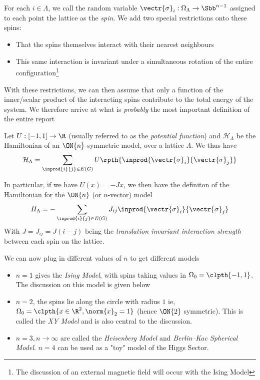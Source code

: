 	For each $i \in \Lambda$, we call the random variable $\vectr{\sigma}_i: \Omega_{\Lambda} 
	\rightarrow \Sbb^{n-1}$ assigned to each point the lattice as the \textit{spin}. We add two special
	restrictions onto these spins: 
	\begin{itemize}
		\item That the spins themselves interact with their nearest neighbours
		\item This same interaction is invariant under a simultaneous rotation of the 
			entire configuration\footnote{The discussion of an external magnetic field will occur with 
			the Ising Model}
	\end{itemize}
	With these restrictions, we can then assume that only a function of the inner/scalar product of the 
	interacting spins contribute to the total energy of the system. We therefore arrive at what is 
	\textit{probably} the most important definition of the entire report

	\begin{ndefi}
		Let $U: [-1,1] \rightarrow \R$ (usually referred to as the \textit {potential function}) 
		and $\mathcal{H}_{\Lambda}$ be the Hamiltonian of an $\ON{n}$-symmetric model, over a lattice 
		$\Lambda$. We thus have
		\begin{equation}
			\mathcal{H}_{\Lambda} = \sum_{\inprod{i}{j} \in E(G)} U\rpth{\inprod{\vectr{\sigma}_i}
			{\vectr{\sigma}_j}}
		\end{equation}

		In particular, if we have $U(x) = -Jx$, we then have the definiton of the Hamiltonian for 
		the $\ON{n}$ (or $n$-vector) model
		\begin{equation}
			H_{\Lambda} = - \sum_{\inprod{i}{j} \in E(G)} J_{ij}\inprod{\vectr{\sigma}_i}
			{\vectr{\sigma}_j}
		\end{equation}
		With $J = J_{ij} = J(i-j)$ being the \textit{translation invariant interaction strength} between
		each spin on the lattice. 
	\end{ndefi}

	We can now plug in different values of $n$ to get different models 
	\begin{itemize}
		\item $n=1$ gives the \textit{Ising Model}, with spins taking values in $\Omega_0 = \clpth{-1,1}$.
			The discussion on this model is given below
		\item $n=2$, the spins lie along the circle with radius $1$ ie, $\Omega_0 = \clpth{x \in \R^2, 
			\norm{x}_2 = 1}$ (hence $\ON{2}$ symmetric). This is called the \textit{XY Model} and is 
			also central to the discussion. 
		\item $n=3, n \rightarrow \infty$ are called the \textit{Heisenberg Model} and 
			\textit{Berlin–Kac Spherical Model}. $n=4$ can be used as a "toy" model of the Higgs Sector.
	\end{itemize}

